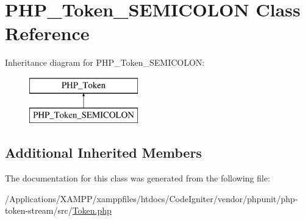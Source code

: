 \hypertarget{class_p_h_p___token___s_e_m_i_c_o_l_o_n}{}\section{P\+H\+P\+\_\+\+Token\+\_\+\+S\+E\+M\+I\+C\+O\+L\+ON Class Reference}
\label{class_p_h_p___token___s_e_m_i_c_o_l_o_n}
Inheritance diagram for P\+H\+P\+\_\+\+Token\+\_\+\+S\+E\+M\+I\+C\+O\+L\+ON\+:\begin{figure}[H]
\begin{center}
\leavevmode
\includegraphics[height=2.000000cm]{class_p_h_p___token___s_e_m_i_c_o_l_o_n}
\end{center}
\end{figure}
\subsection*{Additional Inherited Members}


The documentation for this class was generated from the following file\+:\begin{DoxyCompactItemize}
\item 
/\+Applications/\+X\+A\+M\+P\+P/xamppfiles/htdocs/\+Code\+Igniter/vendor/phpunit/php-\/token-\/stream/src/\mbox{\hyperlink{_token_8php}{Token.\+php}}\end{DoxyCompactItemize}
